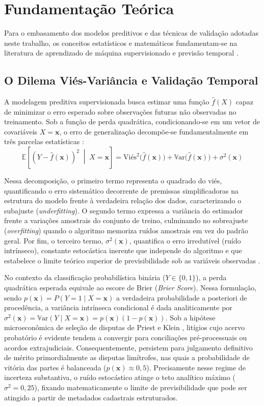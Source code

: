 \documentclass[conference]{IEEEtran}
\begin{document}
\section{Fundamentação Teórica}
Para o embasamento dos modelos preditivos e das técnicas de validação adotadas neste trabalho, os conceitos estatísticos e matemáticos fundamentam-se na literatura de aprendizado de máquina supervisionado e previsão temporal \cite{izbicki2020, hyndman2021}.

\subsection{O Dilema Viés-Variância e Validação Temporal}
A modelagem preditiva supervisionada busca estimar uma função $\hat{f}(X)$ capaz de minimizar o erro esperado sobre observações futuras não observadas no treinamento. Sob a função de perda quadrática, condicionando-se em um vetor de covariáveis $X = \mathbf{x}$, o erro de generalização decompõe-se fundamentalmente em três parcelas estatísticas \cite{izbicki2020}:
\begin{equation}
\mathbb{E}\left[\left(Y - \hat{f}(\mathbf{x})\right)^2 \;\middle|\; X=\mathbf{x}\right] = \text{Viés}^2\big(\hat{f}(\mathbf{x})\big) + \mathbb{V}\text{ar}\big(\hat{f}(\mathbf{x})\big) + \sigma^2(\mathbf{x})
\label{eq:vies_variancia}
\end{equation}

Nessa decomposição, o primeiro termo representa o quadrado do viés, quantificando o erro sistemático decorrente de premissas simplificadoras na estrutura do modelo frente à verdadeira relação dos dados, caracterizando o subajuste (\textit{underfitting}). O segundo termo expressa a variância do estimador frente a variações amostrais do conjunto de treino, culminando no sobreajuste (\textit{overfitting}) quando o algoritmo memoriza ruídos amostrais em vez do padrão geral. Por fim, o terceiro termo, $\sigma^2(\mathbf{x})$, quantifica o erro irredutível (ruído intrínseco), constante estocástica inerente que independe do algoritmo e que estabelece o limite teórico superior de previsibilidade sob as variáveis observadas \cite{izbicki2020}.

No contexto da classificação probabilística binária ($Y \in \{0, 1\}$), a perda quadrática esperada equivale ao escore de Brier (\textit{Brier Score}). Nessa formulação, sendo $p(\mathbf{x}) = P(Y=1 \mid X=\mathbf{x})$ a verdadeira probabilidade a posteriori de procedência, a variância intrínseca condicional é dada analiticamente por $\sigma^2(\mathbf{x}) = \mathbb{V}\text{ar}(Y \mid X=\mathbf{x}) = p(\mathbf{x})(1 - p(\mathbf{x}))$. Sob a hipótese microeconômica de seleção de disputas de Priest e Klein \cite{priest1984, trecenti2021}, litígios cujo acervo probatório é evidente tendem a convergir para conciliações pré-processuais ou acordos extrajudiciais. Consequentemente, persistem para julgamento definitivo de mérito primordialmente as disputas limítrofes, nas quais a probabilidade de vitória das partes é balanceada ($p(\mathbf{x}) \approx 0{,}5$). Precisamente nesse regime de incerteza substantiva, o ruído estocástico atinge o teto analítico máximo ($\sigma^2 = 0{,}25$), fixando matematicamente o limite de previsibilidade que pode ser atingido a partir de metadados cadastrais estruturados.
\end{document}
